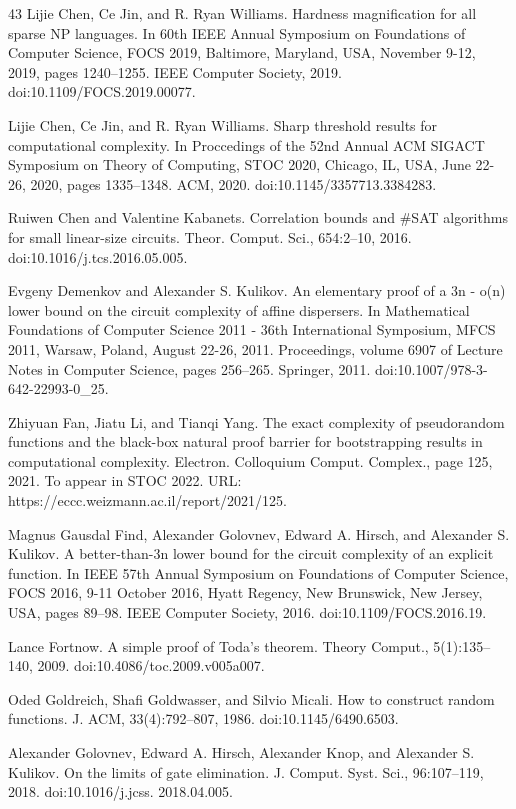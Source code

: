 \documentclass[10pt,a4paper]{article}
\begin{document}
\begin{thebibliography}{43}
Lijie Chen, Ce Jin, and R. Ryan Williams. Hardness magnification for all sparse NP languages. In 60th IEEE Annual Symposium on Foundations of Computer Science, FOCS 2019, Baltimore, Maryland, USA, November 9-12, 2019, pages 1240–1255. IEEE Computer Society, 2019. doi:10.1109/FOCS.2019.00077.

Lijie Chen, Ce Jin, and R. Ryan Williams. Sharp threshold results for computational complexity. In Proccedings of the 52nd Annual ACM SIGACT Symposium on Theory of Computing, STOC 2020, Chicago, IL, USA, June 22-26, 2020, pages 1335–1348. ACM, 2020. doi:10.1145/3357713.3384283.

Ruiwen Chen and Valentine Kabanets. Correlation bounds and \#SAT algorithms for small linear-size circuits. Theor. Comput. Sci., 654:2–10, 2016. doi:10.1016/j.tcs.2016.05.005.

Evgeny Demenkov and Alexander S. Kulikov. An elementary proof of a 3n - o(n) lower bound on the circuit complexity of affine dispersers. In Mathematical Foundations of Computer Science 2011 - 36th International Symposium, MFCS 2011, Warsaw, Poland, August 22-26, 2011. Proceedings, volume 6907 of Lecture Notes in Computer Science, pages 256–265. Springer, 2011. doi:10.1007/978-3-642-22993-0\_25.

Zhiyuan Fan, Jiatu Li, and Tianqi Yang. The exact complexity of pseudorandom functions and the black-box natural proof barrier for bootstrapping results in computational complexity. Electron. Colloquium Comput. Complex., page 125, 2021. To appear in STOC 2022. URL: https://eccc.weizmann.ac.il/report/2021/125.

Magnus Gausdal Find, Alexander Golovnev, Edward A. Hirsch, and Alexander S. Kulikov. A better-than-3n lower bound for the circuit complexity of an explicit function. In IEEE 57th Annual Symposium on Foundations of Computer Science, FOCS 2016, 9-11 October 2016, Hyatt Regency, New Brunswick, New Jersey, USA, pages 89–98. IEEE Computer Society, 2016. doi:10.1109/FOCS.2016.19.

Lance Fortnow. A simple proof of Toda’s theorem. Theory Comput., 5(1):135–140, 2009. doi:10.4086/toc.2009.v005a007.

Oded Goldreich, Shafi Goldwasser, and Silvio Micali. How to construct random functions. J. ACM, 33(4):792–807, 1986. doi:10.1145/6490.6503.

Alexander Golovnev, Edward A. Hirsch, Alexander Knop, and Alexander S. Kulikov. On the limits of gate elimination. J. Comput. Syst. Sci., 96:107–119, 2018. doi:10.1016/j.jcss. 2018.04.005.


\end{thebibliography}
\end{document}
